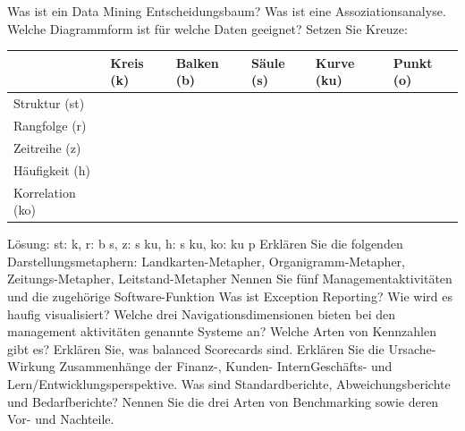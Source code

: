 \documentclass[ngerman,a4paper,12pt]{scrreprt}
\begin{document}
	\li Was ist ein Data Mining Entscheidungsbaum?
	\li Was ist eine Assoziationsanalyse.
	\li Welche Diagrammform ist für welche Daten geeignet? Setzen Sie Kreuze: \newline
	\begin{tabular}{l|l|l|l|l|l|}
	& Kreis (k) & Balken (b) & Säule (s) & Kurve (ku) & Punkt (o) \\
	\hline
	Struktur (st) & & & & & \\
	\hline
	Rangfolge (r) & & & & & \\
	\hline
	Zeitreihe (z) & & & & & \\
	\hline
	Häufigkeit (h) & & & & & \\
	\hline
	Korrelation (ko) & & & & & \\
	\hline
	\end{tabular}
	\newline \newline
	Lösung: st: k, r: b s, z: s ku, h: s ku, ko: ku p
	\li Erklären Sie die folgenden Darstellungsmetaphern: Landkarten-Metapher, Organigramm-Metapher, Zeitungs-Metapher, Leitstand-Metapher
	\li Nennen Sie fünf Managementaktivitäten und die zugehörige Software-Funktion
	\li Was ist Exception Reporting? Wie wird es haufig visualisiert?
	\li Welche drei Navigationsdimensionen bieten bei den management aktivitäten genannte Systeme an?
	\li Welche Arten von Kennzahlen gibt es?
	\li Erklären Sie, was balanced Scorecards sind.
	\li Erklären Sie die Ursache-Wirkung Zusammenhänge der Finanz-, Kunden- InternGeschäfts- und Lern/Entwicklungsperspektive.
	\li Was sind Standardberichte, Abweichungsberichte und Bedarfberichte?
	\li Nennen Sie die drei Arten von Benchmarking sowie deren Vor- und Nachteile.
\olS
\end{document}
